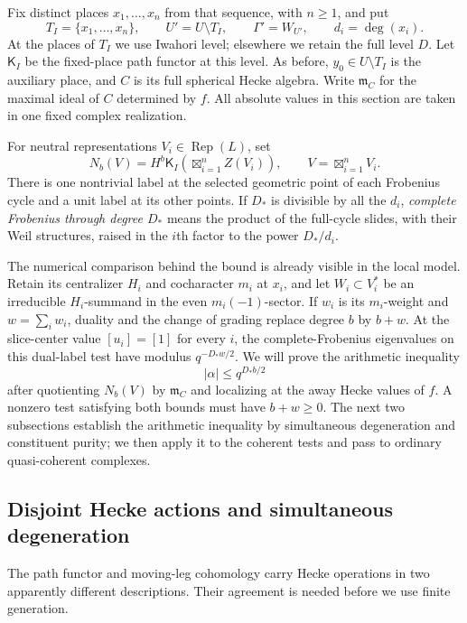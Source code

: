 \documentclass[11pt]{article}
\numberwithin{equation}{section}
\theoremstyle{definition}
\theoremstyle{remark}
\newcommand{\Rep}{\operatorname{Rep}}
\begin{document}
Fix distinct places $x_1,\ldots,x_n$ from that sequence, with $n\geq1$, and
put
\[
 T_I=\{x_1,\ldots,x_n\},\qquad U'=U\setminus T_I,
 \qquad \Gamma'=W_{U'},\qquad d_i=\deg(x_i).
\]
At the places of $T_I$ we use Iwahori level; elsewhere we retain the full
level $D$.  Let $\mathsf K_I$ be the fixed-place path functor at this level.
As before, $y_0\in U\setminus T_I$ is the auxiliary place, and $C$ is its
full spherical Hecke algebra.  Write $\mathfrak m_C$ for the maximal ideal
of $C$ determined by $f$.  All absolute values in this section are taken
in one fixed complex realization.

For neutral representations $V_i\in\Rep(L)$, set
\begin{equation}
 N_b(V)=H^b\mathsf K_I\!\left(\boxtimes_{i=1}^n Z(V_i)\right),
 \qquad V=\boxtimes_{i=1}^nV_i.
 \label{bounds:unsheared}
\end{equation}
There is one nontrivial label at the selected geometric point of each
Frobenius cycle and a unit label at its other points.  If $D_*$ is divisible
by all the $d_i$, \emph{complete Frobenius through degree $D_*$} means the
product of the full-cycle slides, with their Weil structures, raised in
the $i$th factor to the power $D_*/d_i$.

The numerical comparison behind the bound is already visible in the
local model.  Retain its centralizer $H_i$ and cocharacter $m_i$ at
$x_i$, and let $W_i\subset V_i^*$ be an irreducible $H_i$-summand in
the even $m_i(-1)$-sector.  If $w_i$ is its $m_i$-weight and
$w=\sum_iw_i$, duality and the change of grading replace degree $b$
by $b+w$.  At the slice-center value $[u_i]=[1]$ for every $i$, the
complete-Frobenius eigenvalues on this dual-label test have modulus
$q^{-D_*w/2}$.  We will prove the arithmetic inequality
\[
                         |\alpha|\leq q^{D_*b/2}
\]
after quotienting $N_b(V)$ by $\mathfrak m_C$ and localizing at the
away Hecke values of $f$.  A nonzero test satisfying both bounds must
have $b+w\geq0$.  The next two subsections establish the arithmetic
inequality by simultaneous degeneration and constituent purity; we
then apply it to the coherent tests and pass to ordinary
quasi-coherent complexes.

\subsection{Disjoint Hecke actions and simultaneous degeneration}

The path functor and moving-leg cohomology carry Hecke operations in two
apparently different descriptions.  Their agreement is needed before
we use finite generation.
\end{document}
